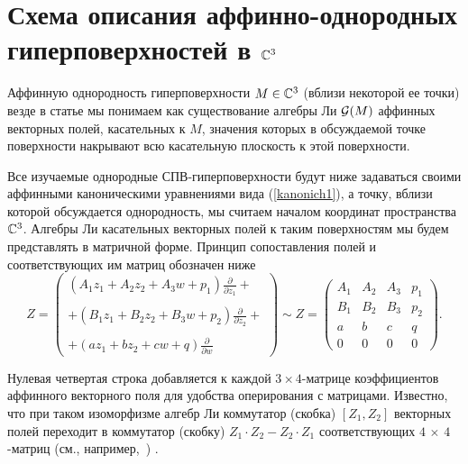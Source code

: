 \section{Схема описания аффинно-однородных гиперповерхностей в $ \Bbb C^3 $ }

  Аффинную однородность гиперповерхности $ M \in \Bbb C^3 $ (вблизи некоторой ее точки)
везде в статье мы понимаем как существование
алгебры Ли $ {\cal{G}}(M) $ аффинных векторных полей, касательных к $ M $,
значения которых в обсуждаемой точке поверхности накрывают всю
касательную плоскость к этой поверхности.



  Все изучаемые однородные СПВ-гиперповерхности будут ниже задаваться
своими аффинными каноническими уравнениями вида (\ref{kanonich1}), а
точку, вблизи которой обсуждается однородность, мы считаем
началом координат пространства $ \Bbb C^3 $.
Алгебры Ли касательных
векторных полей к таким поверхностям мы будем представлять в матричной форме.
Принцип сопоставления полей и соответствующих им матриц обозначен ниже
\begin{equation}
Z=\left(  \begin{array}{cccc}
   \left( A_{1}z_{1}+A_{2}z_{2} + A_{3}w + p_1 \right)
          \frac{\partial }{\partial z_{1}} +\\
    \\
  + \left( B_{1}z_{1}+B_{2}z_{2} + B_{3}w + p_2 \right)
          \frac{\partial }{\partial z_{2}}+\\
   \\
  + \left( az_{1} + bz_{2} + cw + q \right)
        \frac{\partial }{\partial w}
  \end{array}
\right)
\sim
Z =
\left(
\begin{array}{cccc}
A_1 & A_2 & A_3 & p_1\\
B_1 & B_2 & B_3 & p_2\\
a & b & c & q\\
0 & 0 & 0 & 0
\end{array}
\right). \label{matrix_eq_1.1}
\end{equation}

  Нулевая четвертая строка добавляется к каждой
$ 3\times 4 $-матрице коэффициентов аффинного векторного поля для удобства оперирования с матрицами.
  Известно, что при таком изоморфизме алгебр Ли коммутатор (скобка)
$ [Z_1, Z_2] $
  векторных полей переходит в коммутатор (скобку)
$ Z_1\cdot Z_2  - Z_2\cdot Z_1 $
соответствующих $ 4\,\times\, 4 $-матриц (см., например,~\cite{EastwoodEzhov}) .


